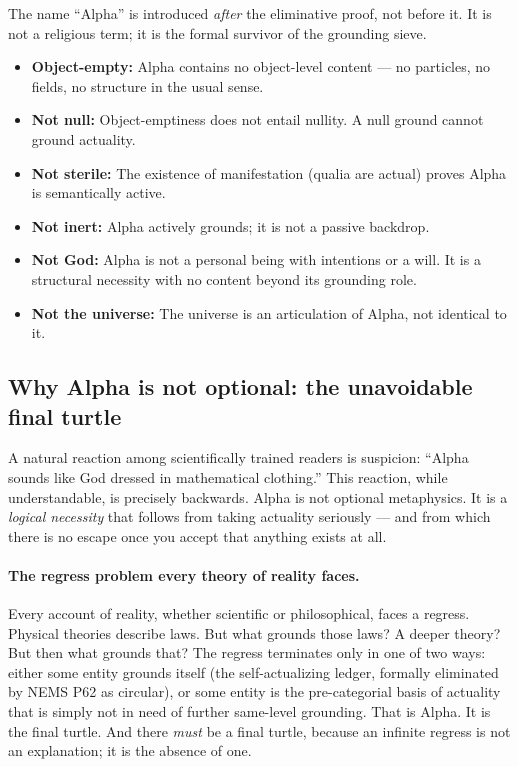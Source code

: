 \documentclass[11pt]{article}
\theoremstyle{remark}
\begin{document}
\noindent The name ``Alpha'' is introduced \emph{after} the eliminative proof, not
before it. It is not a religious term; it is the formal survivor of the grounding sieve.

\begin{tcolorbox}[colback=yellow!14,colframe=yellow!60!black,
  title={What Alpha is (and is not)}]
\begin{itemize}
  \item \textbf{Object-empty:} Alpha contains no object-level content --- no particles,
    no fields, no structure in the usual sense.
  \item \textbf{Not null:} Object-emptiness does not entail nullity. A null ground
    cannot ground actuality.
  \item \textbf{Not sterile:} The existence of manifestation (qualia are actual)
    proves Alpha is semantically active.
  \item \textbf{Not inert:} Alpha actively grounds; it is not a passive backdrop.
  \item \textbf{Not God:} Alpha is not a personal being with intentions or a will.
    It is a structural necessity with no content beyond its grounding role.
  \item \textbf{Not the universe:} The universe is an articulation of Alpha, not
    identical to it.
\end{itemize}
\end{tcolorbox}

\subsection{Why Alpha is not optional: the unavoidable final turtle}\label{sec:alpha-necessary}

A natural reaction among scientifically trained readers is suspicion: ``Alpha sounds
like God dressed in mathematical clothing.'' This reaction, while understandable, is
precisely backwards. Alpha is not optional metaphysics. It is a \emph{logical
necessity} that follows from taking actuality seriously --- and from which there is no
escape once you accept that anything exists at all.

\paragraph{The regress problem every theory of reality faces.}
Every account of reality, whether scientific or philosophical, faces a regress.
Physical theories describe laws. But what grounds those laws? A deeper theory?
But then what grounds that? The regress terminates only in one of two ways: either
some entity grounds itself (the self-actualizing ledger, formally eliminated by NEMS
P62 as circular), or some entity is the pre-categorial basis of actuality that is
simply not in need of further same-level grounding. That is Alpha. It is the final
turtle. And there \emph{must} be a final turtle, because an infinite regress is not
an explanation; it is the absence of one.
\end{document}
